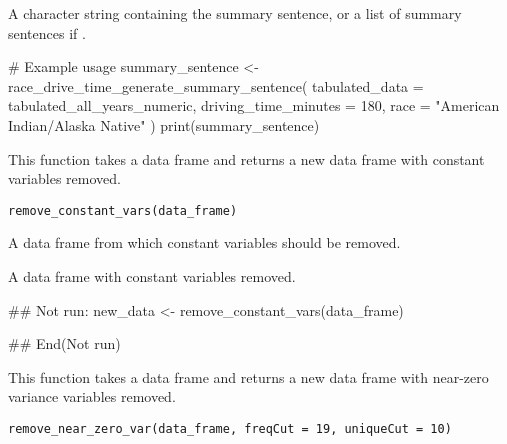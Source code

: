 \documentclass[a4paper]{book}
\begin{document}
%
\begin{Value}
A character string containing the summary sentence, or a list of summary sentences if .
\end{Value}
%
\begin{Examples}
\begin{ExampleCode}
# Example usage
summary_sentence <- race_drive_time_generate_summary_sentence(
  tabulated_data = tabulated_all_years_numeric,
  driving_time_minutes = 180,
  race = "American Indian/Alaska Native"
)
print(summary_sentence)
\end{ExampleCode}
\end{Examples}
%
\begin{Description}
This function takes a data frame and returns a new data frame with constant variables removed.
\end{Description}
%
\begin{Usage}
\begin{verbatim}
remove_constant_vars(data_frame)
\end{verbatim}
\end{Usage}
%
\begin{Arguments}
\begin{ldescription}
\item[\code{data\_frame}] A data frame from which constant variables should be removed.
\end{ldescription}
\end{Arguments}
%
\begin{Value}
A data frame with constant variables removed.
\end{Value}
%
\begin{Examples}
\begin{ExampleCode}
## Not run: 
new_data <- remove_constant_vars(data_frame)

## End(Not run)

\end{ExampleCode}
\end{Examples}
%
\begin{Description}
This function takes a data frame and returns a new data frame with near-zero variance variables removed.
\end{Description}
%
\begin{Usage}
\begin{verbatim}
remove_near_zero_var(data_frame, freqCut = 19, uniqueCut = 10)
\end{verbatim}
\end{Usage}
\end{document}
